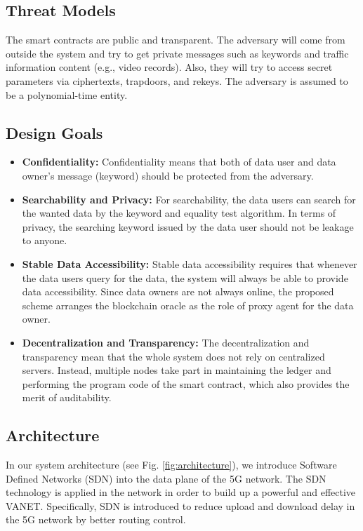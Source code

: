 \documentclass[journal,10pt]{IEEEtran}
\begin{document}
\subsection{Threat Models}
The smart contracts are public and transparent. The adversary will come from outside the system and try to get private messages such as keywords and traffic information content (e.g., video records). Also, they will try to access secret parameters via ciphertexts, trapdoors, and rekeys. The adversary is assumed to be a polynomial-time entity.

\subsection{Design Goals} 
\begin{itemize}
  \item \textbf{Confidentiality:}
  Confidentiality means that both of data user and data owner's message (keyword) should be protected from the adversary.
  \item \textbf{Searchability and Privacy:}
  For searchability, the data users can search for the wanted data by the keyword and equality test algorithm. In terms of privacy, the searching keyword issued by the data user should not be leakage to anyone.
  \item \textbf{Stable Data Accessibility:}
  Stable data accessibility requires that whenever the data users query for the data, the system will always be able to provide data accessibility. Since data owners are not always online, the proposed scheme arranges the blockchain oracle as the role of proxy agent for the data owner.
  \item \textbf{Decentralization and Transparency:}
  The decentralization and transparency mean that the whole system does not rely on centralized servers. Instead, multiple nodes take part in maintaining the ledger and performing the program code of the smart contract, which also provides the merit of auditability.
\end{itemize}

\subsection{Architecture} 
In our system architecture (see Fig. \ref{fig:architecture}), we introduce Software Defined Networks (SDN) into the data plane of the 5G network. The SDN technology is applied in the network in order to build up a powerful and effective VANET. Specifically, SDN is introduced to reduce upload and download delay in the 5G network by better routing control.
\end{document}
